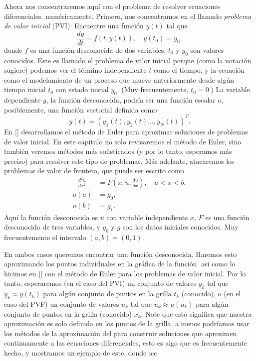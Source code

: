 Ahora nos concentraremos aquí con el problema de resolver ecuaciones diferenciales. numéricamente. Primero, nos concentramos en el llamado \emph{problema de valor inicial} (PVI): Encuentre una función $y\left(t\right)$ tal que \[ \frac{dy}{dt}=f\left(t,y\left(t\right)\right),\quad y\left(t_{0}\right)=y_{0}, \] donde $f$ es una función desconocida de dos variables, $t_{0}$ y $y_{0}$ son valores conocidos. Este es llamado el problema de valor inicial porque (como la notación sugiere) podemos ver el término independiente $t$ como el tiempo, y la ecuación como el modelamiento de un proceso que mueve anteriormente desde algún tiempo inicial $t_{0}$ con estado inicial $y_{0}$. (Muy frecuentemente, $t_{0}=0$.) La variable dependiente $y$, la función desconocida, podría ser una función escalar o, posiblemente, una función vectorial definida como \[ y\left(t\right)={\left(y_{1}\left(t\right),y_{2}\left(t\right)\ldots,y_{N}\left(t\right)\right)}^{T}. \] En \ref{} desarrollamos el método de Euler para aproximar soluciones de problemas de valor inicial. En este capítulo no solo revisaremos el método de Euler, sino también veremos métodos más sofisticados (y por lo tanto, esperamos más preciso) para resolver este tipo de problemas. Más adelante, atacaremos los problemas de valor de frontera, que puede ser escrito como
\begin{align*}
-\frac{d^{2}u}{dx^{2}}&=F\left(x,u,\frac{du}{dx}\right),\quad a<x<b,\\
u\left(a\right)&=g_{0},\\
u\left(b\right)&=g_{1}.
\end{align*}
Aquí la función desconocida es $u$ con variable independiente $x$, $F$ es una función desconocida de tres variables, y $g_{0}$ y $g$ son los datos iniciales conocidos. Muy frecuentemente el intervalo $\left(a,b\right)=\left(0,1\right)$.

En ambos casos queremos encontrar una función desconocida. Haremos esto aproximando los puntos individuales en la gráfica de la función. así como lo hicimos en \ref{} con el método de Euler para los problemas de valor inicial. Por lo tanto, esperaremos (en el caso del PVI) un conjunto de valores $y_{k}$ tal que $y_{k}\approx y\left(t_{k}\right)$ para algún conjunto de puntos en la grilla $t_{k}$ (conocido), o (en el caso del PVF) un conjunto de valores $u_{k}$ tal que $u_{k}\approx u\left(u_{k}\right)$ para algún conjunto de puntos en la grilla (conocido) $x_{k}$. Note que esto significa que nuestra aproximación es solo definida en los puntos de la grilla, a menos podríamos usar los métodos de la aproximación del %
 para construir soluciones que aproximen continuamente a las ecuaciones diferenciales, esto es algo que es frecuentemente hecho, y mostramos un ejemplo de este, donde $we$